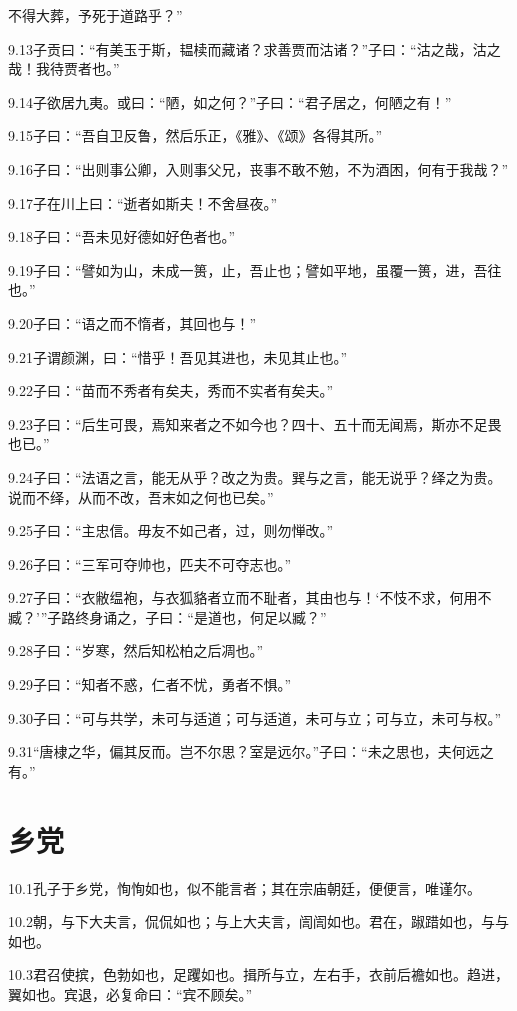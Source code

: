 \documentclass[a4paper,12pt,UTF8,twoside]{ctexbook}
\begin{document}
不得大葬，予死于道路乎？”

9.13子贡曰：“有美玉于斯，韫椟而藏诸？求善贾而沽诸？”子曰：“沽之哉，沽之哉！我待贾者也。”

9.14子欲居九夷。或曰：“陋，如之何？”子曰：“君子居之，何陋之有！”

9.15子曰：“吾自卫反鲁，然后乐正，《雅》、《颂》各得其所。”

9.16子曰：“出则事公卿，入则事父兄，丧事不敢不勉，不为酒困，何有于我哉？”

9.17子在川上曰：“逝者如斯夫！不舍昼夜。”

9.18子曰：“吾未见好德如好色者也。”

9.19子曰：“譬如为山，未成一篑，止，吾止也；譬如平地，虽覆一篑，进，吾往也。”

9.20子曰：“语之而不惰者，其回也与！”

9.21子谓颜渊，曰：“惜乎！吾见其进也，未见其止也。”

9.22子曰：“苗而不秀者有矣夫，秀而不实者有矣夫。”

9.23子曰：“后生可畏，焉知来者之不如今也？四十、五十而无闻焉，斯亦不足畏也已。”

9.24子曰：“法语之言，能无从乎？改之为贵。巽与之言，能无说乎？绎之为贵。说而不绎，从而不改，吾末如之何也已矣。”

9.25子曰：“主忠信。毋友不如己者，过，则勿惮改。”

9.26子曰：“三军可夺帅也，匹夫不可夺志也。”

9.27子曰：“衣敝缊袍，与衣狐貉者立而不耻者，其由也与！‘不忮不求，何用不臧？’”子路终身诵之，子曰：“是道也，何足以臧？”

9.28子曰：“岁寒，然后知松柏之后凋也。”

9.29子曰：“知者不惑，仁者不忧，勇者不惧。”

9.30子曰：“可与共学，未可与适道；可与适道，未可与立；可与立，未可与权。”

9.31“唐棣之华，偏其反而。岂不尔思？室是远尔。”子曰：“未之思也，夫何远之有。”

\chapter{乡党}
10.1孔子于乡党，恂恂如也，似不能言者；其在宗庙朝廷，便便言，唯谨尔。

10.2朝，与下大夫言，侃侃如也；与上大夫言，訚訚如也。君在，踧踖如也，与与如也。

10.3君召使摈，色勃如也，足躩如也。揖所与立，左右手，衣前后襜如也。趋进，翼如也。宾退，必复命曰：“宾不顾矣。”
\end{document}
